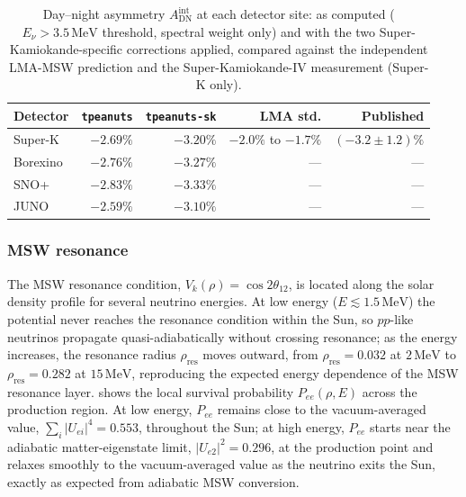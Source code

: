 \begin{table}[htbp]
  \centering
  \footnotesize
  \caption{Day--night asymmetry \(A_{\mathrm{DN}}^{\mathrm{int}}\) at each detector site: as computed (\(E_\nu>3.5\,\mathrm{MeV}\) threshold, spectral weight only) and with the two Super-Kamiokande-specific corrections applied, compared against the independent LMA-MSW prediction and the Super-Kamiokande-IV measurement (Super-K only).}
  \label{tab:solar-dn-comparison}
  \begin{tabular}{@{}lrrrr@{}}
    \toprule
    Detector & \texttt{tpeanuts} & \texttt{tpeanuts-sk} & LMA std. & Published \\
    \midrule
    Super-K  & \(-2.69\%\) & \(-3.20\%\) & \(-2.0\%\) to \(-1.7\%\) & \((-3.2\pm1.2)\%\) \\
    Borexino & \(-2.76\%\) & \(-3.27\%\) & --- & --- \\
    SNO+     & \(-2.83\%\) & \(-3.33\%\) & --- & --- \\
    JUNO     & \(-2.59\%\) & \(-3.10\%\) & --- & --- \\
    \bottomrule
  \end{tabular}
\end{table}

\subsubsection{MSW resonance}

The MSW resonance condition, \(V_k(\rho)=\cos2\theta_{12}\), is located along the solar density profile for several neutrino energies. At low energy (\(E\lesssim1.5\,\mathrm{MeV}\)) the potential never reaches the resonance condition within the Sun, so \(pp\)-like neutrinos propagate quasi-adiabatically without crossing resonance; as the energy increases, the resonance radius \(\rho_{\mathrm{res}}\) moves outward, from \(\rho_{\mathrm{res}}=0.032\) at \(2\,\mathrm{MeV}\) to \(\rho_{\mathrm{res}}=0.282\) at \(15\,\mathrm{MeV}\), reproducing the expected energy dependence of the MSW resonance layer.  shows the local survival probability \(P_{ee}(\rho,E)\) across the production region. At low energy, \(P_{ee}\) remains close to the vacuum-averaged value, \(\sum_i|U_{ei}|^4=0.553\), throughout the Sun; at high energy, \(P_{ee}\) starts near the adiabatic matter-eigenstate limit, \(|U_{e2}|^2=0.296\), at the production point and relaxes smoothly to the vacuum-averaged value as the neutrino exits the Sun, exactly as expected from adiabatic MSW conversion.

